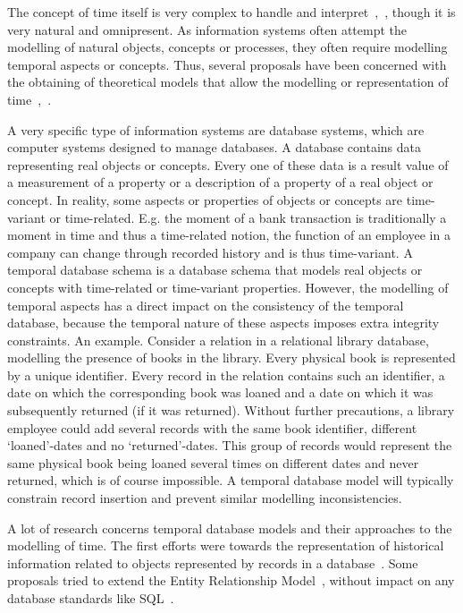 %
%

The concept of time itself is very complex to handle and interpret~\cite{klein94},~\cite{Shackle61}, though it is very natural and omnipresent. As information systems often attempt the modelling of natural objects, concepts or processes, they often require modelling temporal aspects or concepts. Thus, several proposals have been concerned with the obtaining of theoretical models that allow the modelling or representation of time~\cite{Bolour82},~\cite{Cru97}.

A very specific type of information systems are database systems, which are computer systems designed to manage databases. A database contains data representing real objects or concepts. Every one of these data is a result value of a measurement of a property or a description of a property of a real object or concept. In reality, some aspects or properties of objects or concepts are time-variant or time-related. E.g. the moment of a bank transaction is traditionally a moment in time and thus a time-related notion, the function of an employee in a company can change through recorded history and is thus time-variant. A temporal database schema is a database schema that models real objects or concepts with time-related or time-variant properties. However, the modelling of temporal aspects has a direct impact on the consistency of the temporal database, because the temporal nature of these aspects imposes extra integrity constraints. An example. Consider a relation in a relational library database, modelling the presence of books in the library. Every physical book is represented by a unique identifier. Every record in the relation contains such an identifier, a date on which the corresponding book was loaned and a date on which it was subsequently returned (if it was returned). Without further precautions, a library employee could add several records with the same book identifier, different `loaned'-dates and no `returned'-dates. This group of records would represent the same physical book being loaned several times on different dates and never returned, which is of course impossible. A temporal database model will typically constrain record insertion and prevent similar modelling inconsistencies.

A lot of research concerns temporal database models and their approaches to the modelling of time. The first efforts were towards the representation of historical information related to objects represented by records in a database~\cite{Clifford:1985:AHR:971699.318922}. Some proposals tried to extend the Entity Relationship Model~\cite{Klopprogge:1983}, without impact on any database standards like SQL~\cite{Sarda:1990:ESH:627277.627409}.

